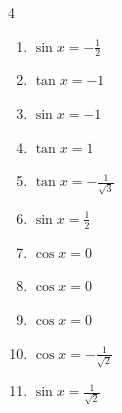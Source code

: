 \begin{multicols}{4}
\begin{enumerate}
  \item $\displaystyle \sin{x}  = -\frac{1}{2}$


\columnbreak %

  \item $\displaystyle \tan{x}  = -1$


  \item $\displaystyle \sin{x}  = -1$


  \item $\displaystyle \tan{x}  = 1$


  \item $\displaystyle \tan{x}  = -\frac{1}{\sqrt{3}}$


  \item $\displaystyle \sin{x}  = \frac{1}{2}$


  \item $\displaystyle \cos{x}  = 0$


  \item $\displaystyle \cos{x}  = 0$


  \item $\displaystyle \cos{x}  = 0$


  \item $\displaystyle \cos{x}  = -\frac{1}{\sqrt{2}}$


  \item $\displaystyle \sin{x}  = \frac{1}{\sqrt{2}}$



\end{enumerate}
\end{multicols}

